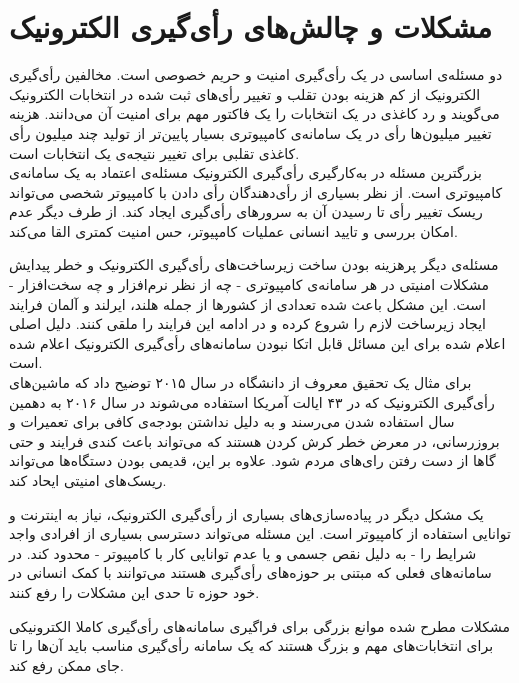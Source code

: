 \section{مشکلات و چالش‌های رأی‌گیری الکترونیک}
\par
دو مسئله‌ی اساسی در یک رأی‌گیری امنیت و حریم خصوصی است. مخالفین رأی‌گیری الکترونیک از کم هزینه بودن تقلب و تغییر رأی‌های ثبت شده در انتخابات الکترونیک می‌گویند و رد کاغذی در یک انتخابات را یک فاکتور مهم برای امنیت آن می‌دانند. هزینه تغییر میلیون‌ها رأی در یک سامانه‌ی کامپیوتری بسیار پایین‌تر از تولید چند میلیون رأی کاغذی تقلبی برای تغییر نتیجه‌ی یک انتخابات است.
\\
بزرگترین مسئله در به‌کارگیری رأی‌گیری الکترونیک مسئله‌ی اعتماد به یک سامانه‌ی‌ کامپیوتری است. از نظر بسیاری از رأی‌دهندگان رأی دادن با کامپیوتر شخصی می‌تواند ریسک تغییر رأی تا رسیدن آن به سرور‌های رأی‌گیری ایجاد کند. از طرف دیگر عدم امکان بررسی و تایید انسانی عملیات کامپیوتر، حس امنیت کمتری القا می‌کند.
\par
مسئله‌ی دیگر پرهزینه بودن ساخت زیرساخت‌های رأی‌گیری الکترونیک و خطر پیدایش مشکلات امنیتی در هر سامانه‌ی کامپیوتری - چه از نظر نرم‌افزار و چه سخت‌افزار - است. این مشکل باعث شده تعدادی از کشور‌ها از جمله هلند، ایرلند و آلمان فرایند ایجاد زیرساخت لازم را شروع کرده و در ادامه این فرایند را ملقی کنند. دلیل اصلی اعلام شده برای این مسائل‌ قابل اتکا نبودن سامانه‌های رأی‌گیری الکترونیک اعلام شده است. 
\\
برای مثال یک تحقیق معروف از دانشگاه‌  در سال ۲۰۱۵ 
توضیح داد که ماشین‌های رأی‌گیری الکترونیک که در ۴۳ ایالت آمریکا استفاده می‌شوند در سال ۲۰۱۶ به دهمین سال استفاده شدن می‌رسند و به دلیل نداشتن بودجه‌ی کافی برای تعمیرات و بروزرسانی، در معرض خطر کرش
 کردن هستند که می‌تواند باعث کندی فرایند و حتی گاها از دست رفتن را‌ی‌های مردم شود. علاوه بر این، قدیمی بودن دستگاه‌ها می‌تواند ریسک‌های امنیتی ایحاد کند. 

\par
یک مشکل دیگر در پیاده‌سازی‌های بسیاری از رأی‌گیری الکترونیک، نیاز به اینترنت و توانایی استفاده از کامپیوتر است. این مسئله می‌تواند دسترسی بسیاری از افرادی واجد شرایط را - به دلیل نقص جسمی و یا عدم توانایی کار با کامپیوتر - محدود کند. در سامانه‌های فعلی که مبتنی بر حوزه‌های رأی‌گیری هستند می‌توانند با کمک انسانی در خود حوزه تا حدی این مشکلات را رفع کنند. 
\par
مشکلات مطرح‌ شده موانع بزرگی برای فراگیری سامانه‌های رأی‌گیری کاملا الکترونیکی برای انتخابات‌های مهم و بزرگ هستند که یک سامانه رأی‌گیری مناسب باید آن‌ها را تا جای ممکن رفع کند. 

